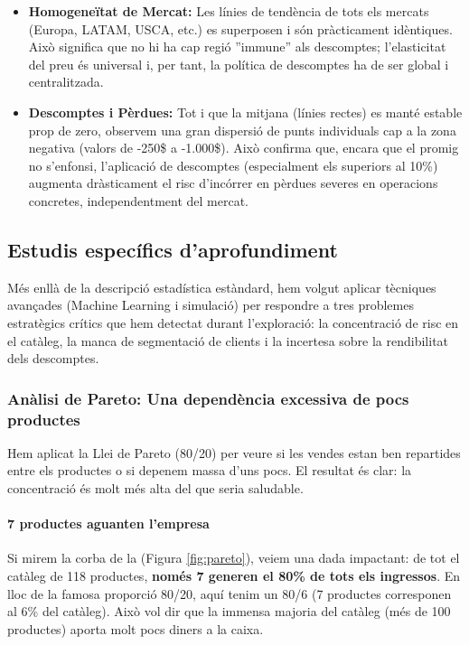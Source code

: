 \documentclass[12pt,a4paper]{article}
\begin{document}
\begin{itemize}
    \item \textbf{Homogeneïtat de Mercat:} Les línies de tendència de tots els mercats (Europa, LATAM, USCA, etc.) es superposen i són pràcticament idèntiques. Això significa que no hi ha cap regió ''immune'' als descomptes; l'elasticitat del preu és universal i, per tant, la política de descomptes ha de ser global i centralitzada.
    
    \item \textbf{Descomptes i Pèrdues:} Tot i que la mitjana (línies rectes) es manté estable prop de zero, observem una gran dispersió de punts individuals cap a la zona negativa (valors de -250\$ a -1.000\$). Això confirma que, encara que el promig no s'enfonsi, l'aplicació de descomptes (especialment els superiors al 10\%) augmenta dràsticament el risc d'incórrer en pèrdues severes en operacions concretes, independentment del mercat.
\end{itemize}
\subsection{Estudis específics d'aprofundiment}

Més enllà de la descripció estadística estàndard, hem volgut aplicar tècniques avançades (Machine Learning i simulació) per respondre a tres problemes estratègics crítics que hem detectat durant l'exploració: la concentració de risc en el catàleg, la manca de segmentació de clients i la incertesa sobre la rendibilitat dels descomptes.

\subsubsection{Anàlisi de Pareto: Una dependència excessiva de pocs productes}
Hem aplicat la Llei de Pareto (80/20) per veure si les vendes estan ben repartides entre els productes o si depenem massa d'uns pocs. El resultat és clar: la concentració és molt més alta del que seria saludable.

\paragraph{7 productes aguanten l'empresa}
Si mirem la corba de la (Figura \ref{fig:pareto}), veiem una dada impactant: de tot el catàleg de 118 productes, \textbf{només 7 generen el 80\% de tots els ingressos}.
En lloc de la famosa proporció 80/20, aquí tenim un 80/6 (7 productes corresponen al 6\% del catàleg). Això vol dir que la immensa majoria del catàleg (més de 100 productes) aporta molt pocs diners a la caixa.
\end{document}
